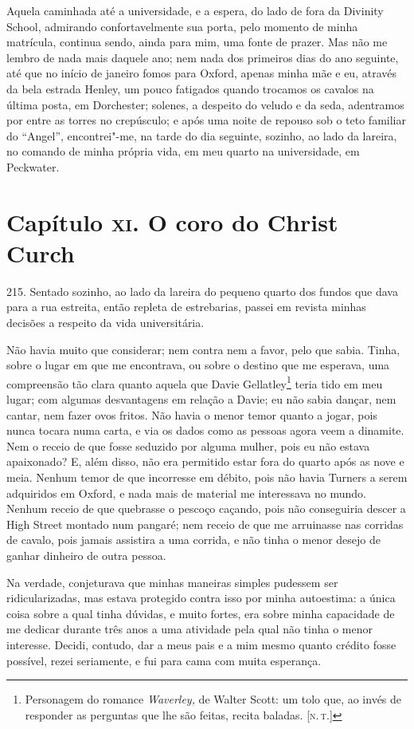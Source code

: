 Aquela caminhada até a universidade, e a espera, do lado de fora da
Divinity School, admirando confortavelmente sua porta, pelo momento de
minha matrícula, continua sendo, ainda para mim, uma fonte de prazer.
Mas não me lembro de nada mais daquele ano; nem nada dos primeiros dias
do ano seguinte, até que no início de janeiro fomos para Oxford, apenas
minha mãe e eu, através da bela estrada Henley, um pouco fatigados
quando trocamos os cavalos na última posta, em Dorchester; solenes, a
despeito do veludo e da seda, adentramos por entre as torres no
crepúsculo; e após uma noite de repouso sob o teto familiar do
``Angel'', encontrei"-me, na tarde do dia seguinte, sozinho, ao lado da
lareira, no comando de minha própria vida, em meu quarto na
universidade, em Peckwater.

\chapter{Capítulo \textsc{xi}. O coro do Christ Curch}

215. Sentado sozinho, ao lado da lareira do pequeno quarto dos fundos
que dava para a rua estreita, então repleta de estrebarias, passei em
revista minhas decisões a respeito da vida universitária.

Não havia muito que considerar; nem contra nem a favor, pelo que sabia.
Tinha, sobre o lugar em que me encontrava, ou sobre o destino que me
esperava, uma compreensão tão clara quanto aquela que Davie
Gellatley\footnote{Personagem do romance \emph{Waverley,} de Walter
  Scott: um tolo que, ao invés de responder as perguntas que lhe são
  feitas, recita baladas. {[}\textsc{n.\,t.}{]}} teria tido em meu lugar; com
algumas desvantagens em relação a Davie; eu não sabia dançar, nem
cantar, nem fazer ovos fritos. Não havia o menor temor quanto a jogar,
pois nunca tocara numa carta, e via os dados como as pessoas agora veem
a dinamite. Nem o receio de que fosse seduzido por alguma mulher, pois
eu não estava apaixonado? E, além disso, não era permitido estar fora do
quarto após as nove e meia. Nenhum temor de que incorresse em débito,
pois não havia Turners a serem adquiridos em Oxford, e nada mais de
material me interessava no mundo. Nenhum receio de que quebrasse o
pescoço caçando, pois não conseguiria descer a High Street montado num
pangaré; nem receio de que me arruinasse nas corridas de cavalo, pois
jamais assistira a uma corrida, e não tinha o menor desejo de ganhar
dinheiro de outra pessoa.

Na verdade, conjeturava que minhas maneiras simples pudessem ser
ridicularizadas, mas estava protegido contra isso por minha autoestima:
a única coisa sobre a qual tinha dúvidas, e muito fortes, era sobre
minha capacidade de me dedicar durante três anos a uma atividade pela
qual não tinha o menor interesse. Decidi, contudo, dar a meus pais e a
mim mesmo quanto crédito fosse possível, rezei seriamente, e fui para
cama com muita esperança.

